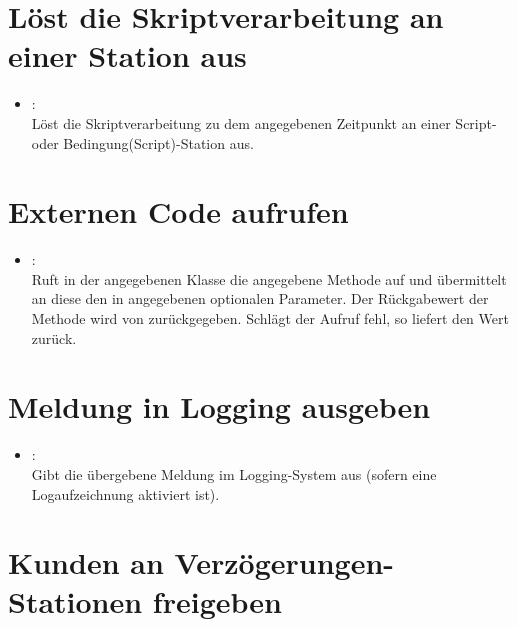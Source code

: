 \section{Löst die Skriptverarbeitung an einer Station aus}

\begin{itemize}

\item
{}:\\
Löst die Skriptverarbeitung zu dem angegebenen Zeitpunkt an einer Script- oder Bedingung(Script)-Station aus.

\end{itemize}

\section{Externen Code aufrufen}

\begin{itemize}

\item
{}:\\
Ruft in der angegebenen Klasse die angegebene Methode auf und übermittelt an diese den in
 angegebenen optionalen Parameter. Der Rückgabewert der Methode wird von 
zurückgegeben. Schlägt der Aufruf fehl, so liefert  den Wert  zurück.
\end{itemize}

\section{Meldung in Logging ausgeben}

\begin{itemize}

\item
{}:\\
Gibt die übergebene Meldung im Logging-System aus (sofern eine Logaufzeichnung aktiviert ist).

\end{itemize}

\section{Kunden an Verzögerungen-Stationen freigeben}

